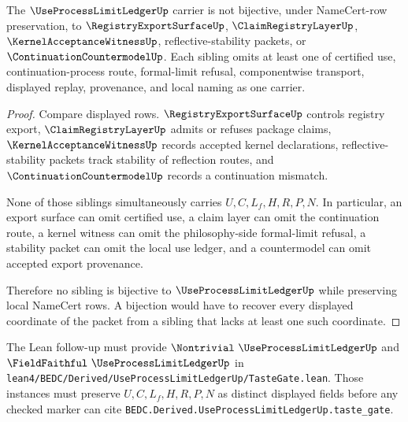 \begin{theorem}
\label{thm:use-process-limit-ledger-sibling-independence}
The $\UseProcessLimitLedgerUp$ carrier is not bijective, under NameCert-row preservation, to $\RegistryExportSurfaceUp$, $\ClaimRegistryLayerUp$, $\KernelAcceptanceWitnessUp$, reflective-stability packets, or $\ContinuationCountermodelUp$. Each sibling omits at least one of certified use, continuation-process route, formal-limit refusal, componentwise transport, displayed replay, provenance, and local naming as one carrier.
\end{theorem}
\begin{proof}
Compare displayed rows. $\RegistryExportSurfaceUp$ controls registry export, $\ClaimRegistryLayerUp$ admits or refuses package claims, $\KernelAcceptanceWitnessUp$ records accepted kernel declarations, reflective-stability packets track stability of reflection routes, and $\ContinuationCountermodelUp$ records a continuation mismatch.

None of those siblings simultaneously carries $U,C,L_f,H,R,P,N$. In particular, an export surface can omit certified use, a claim layer can omit the continuation route, a kernel witness can omit the philosophy-side formal-limit refusal, a stability packet can omit the local use ledger, and a countermodel can omit accepted export provenance.

Therefore no sibling is bijective to $\UseProcessLimitLedgerUp$ while preserving local NameCert rows. A bijection would have to recover every displayed coordinate of the packet from a sibling that lacks at least one such coordinate.
\end{proof}



The Lean follow-up must provide $\Nontrivial\ \UseProcessLimitLedgerUp$ and $\FieldFaithful\ \UseProcessLimitLedgerUp$ in \texttt{lean4/BEDC/Derived/UseProcessLimitLedgerUp/TasteGate.lean}. Those instances must preserve $U,C,L_f,H,R,P,N$ as distinct displayed fields before any checked marker can cite \texttt{BEDC.Derived.UseProcessLimitLedgerUp.taste\_gate}.

